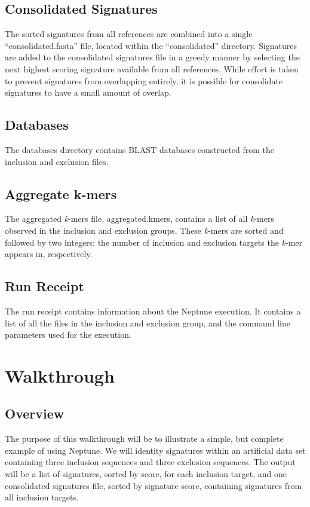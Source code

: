 \documentclass[a4paper,10pt]{article}
\begin{document}
\subsection{Consolidated Signatures}

The sorted signatures from all references are combined into a single ``consolidated.fasta'' file, located within the ``consolidated'' directory. Signatures are added to the consolidated signatures file in a greedy manner by selecting the next highest scoring signature available from all references. While effort is taken to prevent signatures from overlapping entirely, it is possible for consolidate signatures to have a small amount of overlap.

\subsection{Databases}

The databases directory contains BLAST databases constructed from the inclusion and exclusion files.

\subsection{Aggregate k-mers}

The aggregated \textit{k}-mers file, aggregated.kmers, contains a list of all \textit{k}-mers observed in the inclusion and exclusion groups. These \textit{k}-mers are sorted and followed by two integers: the number of inclusion and exclusion targets the \textit{k}-mer appears in, respectively.

\subsection{Run Receipt}

The run receipt contains information about the Neptune execution. It contains a list of all the files in the inclusion and exclusion group, and the command line parameters used for the execution.

\newpage
\section{Walkthrough}

\subsection{Overview}

The purpose of this walkthrough will be to illustrate a simple, but complete example of using Neptune. We will identity signatures within an artificial data set containing three inclusion sequences and three exclusion sequences. The output will be a list of signatures, sorted by score, for each inclusion target, and one consolidated signatures file, sorted by signature score, containing signatures from all inclusion targets.
\end{document}
